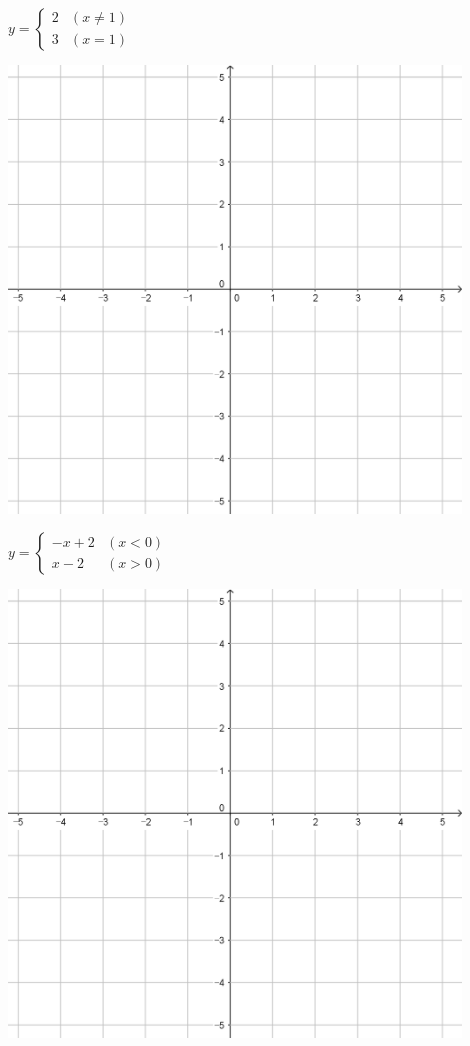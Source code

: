 \documentclass{oblivoir}
\begin{document}
\begin{minipage}{0.45\textwidth}\centering
\(y=\begin{cases}2&(x\neq1)\\3&(x=1)\end{cases}\)
\par\bigskip\includegraphics[width=0.9\textwidth]{55}
\end{minipage}
\begin{minipage}{0.45\textwidth}\centering
\(y=\begin{cases}-x+2&(x<0)\\x-2&(x>0)\end{cases}\)
\par\bigskip\includegraphics[width=0.9\textwidth]{55}
\end{minipage}\bigskip\bigskip\par
\end{document}
